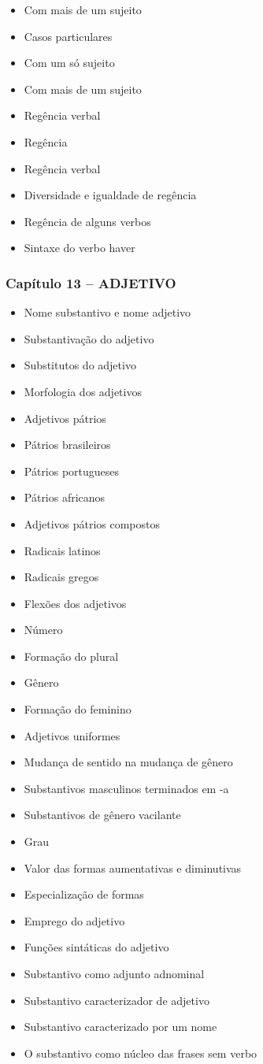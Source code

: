 \documentclass[a4paper,12pt]{article}[abntex2]
\begin{document}
\begin{itemize}
    \item Com mais de um sujeito
    \item Casos particulares
    \item Com um só sujeito
    \item Com mais de um sujeito
    \item Regência verbal
    \item Regência
    \item Regência verbal
    \item Diversidade e igualdade de regência
    \item Regência de alguns verbos
    \item Sintaxe do verbo haver
\end{itemize}

\subsubsection*{Capítulo 13 – ADJETIVO}
\begin{itemize}
    \item Nome substantivo e nome adjetivo
    \item Substantivação do adjetivo
    \item Substitutos do adjetivo
    \item Morfologia dos adjetivos
    \item Adjetivos pátrios
    \item Pátrios brasileiros
    \item Pátrios portugueses
    \item Pátrios africanos
    \item Adjetivos pátrios compostos
    \item Radicais latinos
    \item Radicais gregos
    \item Flexões dos adjetivos
    \item Número
    \item Formação do plural
    \item Gênero
    \item Formação do feminino
    \item Adjetivos uniformes
    \item Mudança de sentido na mudança de gênero
    \item Substantivos masculinos terminados em -a
    \item Substantivos de gênero vacilante
    \item Grau
    \item Valor das formas aumentativas e diminutivas
    \item Especialização de formas
    \item Emprego do adjetivo
    \item Funções sintáticas do adjetivo
    \item Substantivo como adjunto adnominal
    \item Substantivo caracterizador de adjetivo
    \item Substantivo caracterizado por um nome
    \item O substantivo como núcleo das frases sem verbo
\end{itemize}
\end{document}
